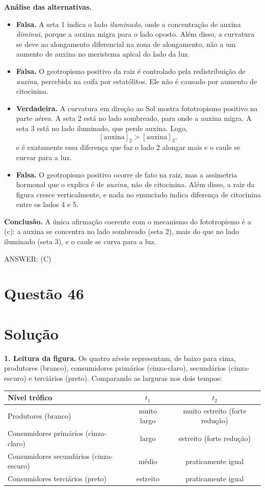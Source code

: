 \documentclass{article}%
\begin{document}
\textbf{Análise das alternativas.}
\begin{itemize}
\item[a)] \textbf{Falsa.} A seta 1 indica o lado \emph{iluminado}, onde a concentração de auxina \emph{diminui}, porque a auxina migra para o lado oposto. Além disso, a curvatura se deve ao alongamento diferencial na zona de alongamento, não a um aumento de auxina no meristema apical do lado da luz.
\item[b)] \textbf{Falsa.} O geotropismo positivo da raiz é controlado pela redistribuição de \emph{auxina}, percebida na coifa por estatólitos. Ele não é causado por aumento de citocinina.
\item[c)] \textbf{Verdadeira.} A curvatura em direção ao Sol mostra fototropismo positivo na parte aérea. A seta 2 está no lado sombreado, para onde a auxina migra. A seta 3 está no lado iluminado, que perde auxina. Logo,
\[
[\text{auxina}]_{2} > [\text{auxina}]_{3},
\]
e é exatamente essa diferença que faz o lado 2 alongar mais e o caule se curvar para a luz.
\item[d)] \textbf{Falsa.} O geotropismo positivo ocorre de fato na raiz, mas a assimetria hormonal que o explica é de \emph{auxina}, não de citocinina. Além disso, a raiz da figura cresce verticalmente, e nada no enunciado indica diferença de citocinina entre os lados 4 e 5.
\end{itemize}

\textbf{Conclusão.} A única afirmação coerente com o mecanismo do fototropismo é a (c): a auxina se concentra no lado sombreado (seta 2), mais do que no lado iluminado (seta 3), e o caule se curva para a luz.

ANSWER: (C)%
\newpage%
\section*{Questão 46}

\section*{Solução}

\textbf{1. Leitura da figura.} Os quatro níveis representam, de baixo para cima, produtores (branco), consumidores primários (cinza-claro), secundários (cinza-escuro) e terciários (preto). Comparando as larguras nos dois tempos:

\begin{center}
\begin{tabular}{lcc}
\hline
Nível trófico & $t_1$ & $t_2$ \\
\hline
Produtores (branco) & muito largo & muito estreito (forte redução) \\
Consumidores primários (cinza-claro) & largo & estreito (forte redução) \\
Consumidores secundários (cinza-escuro) & médio & praticamente igual \\
Consumidores terciários (preto) & estreito & praticamente igual \\
\hline
\end{tabular}
\end{center}
\end{document}
